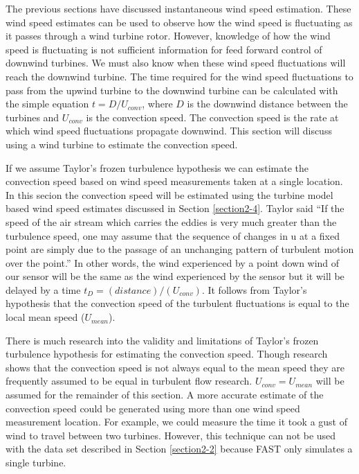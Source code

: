 The previous sections have discussed instantaneous wind speed estimation. These wind speed estimates can be used to observe how the wind speed is fluctuating as it passes through a wind turbine rotor. However, knowledge of how the wind speed is fluctuating is not sufficient information for feed forward control of downwind turbines. We must also know when these wind speed fluctuations will reach the downwind turbine. The time required for the wind speed fluctuations to pass from the upwind turbine to the downwind turbine can be calculated with the simple equation $t = D/U_{conv}$, where $D$ is the downwind distance between the turbines and $U_{conv}$ is the convection speed. The convection speed is the rate at which wind speed fluctuations propagate downwind. This section will discuss using a wind turbine to estimate the convection speed.

If we assume Taylor's frozen turbulence hypothesis we can estimate the convection speed based on wind speed measurements taken at a single location. In this secion the convection speed will be estimated using the turbine model based wind speed estimates discussed in Section \ref{section2-4}. Taylor said ``If the speed of the air stream which carries the eddies is very much greater than the turbulence speed, one may assume that the sequence of changes in u at a fixed point are simply due to the passage of an unchanging pattern of turbulent motion over the point.''\cite{taylor1938} In other words, the wind experienced by a point down wind of our sensor will be the same as the wind experienced by the sensor but it will be delayed by a time $t_D = (distance)/(U_{conv})$. It follows from Taylor's hypothesis that the convection speed of the turbulent fluctuations is equal to the local mean speed ($U_{mean}$). 

There is much research into the validity and limitations of Taylor's frozen turbulence hypothesis for estimating the convection speed.\cite{dennis2008,goldschmidt1981,delalamo2009,atkinson2015} Though research shows that the convection speed is not always equal to the mean speed they are frequently assumed to be equal in turbulent flow research. $U_{conv} = U_{mean}$ will be assumed for the remainder of this section. A more accurate estimate of the convection speed could be generated using more than one wind speed measurement location. For example, we could measure the time it took a gust of wind to travel between two turbines. However, this technique can not be used with the data set described in Section \ref{section2-2} because FAST only simulates a single turbine.

